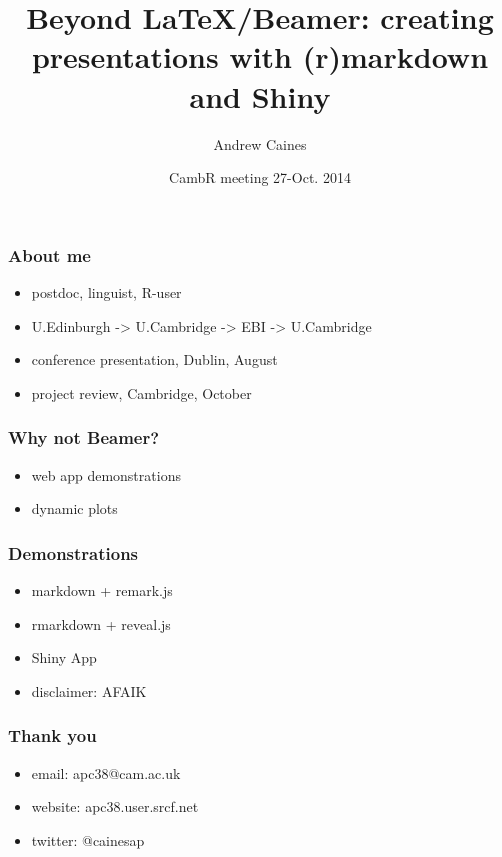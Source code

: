 \documentclass{beamer}
\title{Beyond LaTeX/Beamer: creating presentations with (r)markdown and Shiny}
\author{Andrew Caines}
\institute{ALTA Institute / DTAL, University of Cambridge}
\date{CambR meeting 27-Oct. 2014}
\begin{document}
\frame{\titlepage}

\begin{frame}
\frametitle{About me}
\begin{itemize}
\item postdoc, linguist, R-user
\pause
\item U.Edinburgh -> U.Cambridge -> EBI -> U.Cambridge
\pause
\item conference presentation, Dublin, August
\item project review, Cambridge, October
\end{itemize}
\end{frame}

\begin{frame}
\frametitle{Why not Beamer?}
\begin{itemize}
\item web app demonstrations
\item dynamic plots
\end{itemize}
\end{frame}

\begin{frame}
\frametitle{Demonstrations}
\begin{itemize}
\item markdown + remark.js
\item rmarkdown + reveal.js
\item Shiny App
\item disclaimer: AFAIK
\end{itemize}
\end{frame}

\begin{frame}
\frametitle{Thank you}
\begin{itemize}
\item email: apc38@cam.ac.uk
\item website: apc38.user.srcf.net
\item twitter: @cainesap
\end{itemize}
\end{frame}
\end{document}
